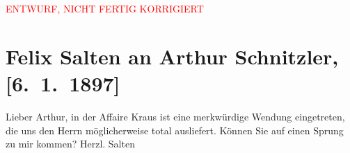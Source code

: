
\begin{center}
            \textcolor{red}{ENTWURF, NICHT FERTIG KORRIGIERT}
                      \end{center}
            
         
         \renewcommand{\erwaehntePersonen}{Personen: Karl Kraus}
         \renewcommand{\erwaehnteOrte}{Orte: Wien}
         \renewcommand{\erwaehnteWerke}{}
               \section[Felix Salten an Arthur Schnitzler, {[}6. 1. 1897{]}]{ Felix Salten an Arthur Schnitzler, {[}6. 1. 1897{]}}\nopagebreak{}\rehead{ }\begin{ledgroupsized}[t]{13cm}\normalsize\beginnumbering \toendnotes[C]{\smallbreak\pagebreak[2]} 
\pstart
           \noindent{}{\pb}Lieber Arthur, in der Affaire Kraus ist eine merkwürdige Wendung eingetreten, die uns den Herrn
               möglicherweise total ausliefert. \pend
           \pstart
           Können Sie auf einen Sprung zu mir kommen? \pend
           \pstart Herzl. \spacefill\mbox{Salten }\pend{}
         
         \endnumbering{}\end{ledgroupsized}\begin{anhang}\end{anhang}\newcommand{\dateiname}{L03261}\newcommand{\titel}{Felix Salten an Arthur Schnitzler, [6. 1. 1897]}\newcommand{\editorInnen}{Martin Anton Müller und Laura Untner}
      